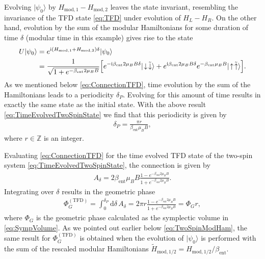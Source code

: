 \documentclass[a4paper,11pt]{article}
\renewcommand{\i}{\text{i}}
\renewcommand{\d}{\text{d}}
\newcommand{\1}{\mathds{1}}
\newcommand{\tfd}{\text{TFD}}
\begin{document}
Evolving $|\psi_0\rangle$ by $H_{\text{mod},1}-H_{\text{mod},2}$ leaves the state invariant, resembling the invariance of the TFD state \eqref{eq:TFD} under evolution of $H_L-H_R$. On the other hand, evolution by the sum of the modular Hamiltonians for some duration of time $\delta$ (modular time in this example)  gives rise to the state
\begin{align}
    U|\psi_0\rangle&=e^{\i(H_{\text{mod},1}+H_{\text{mod},2})\delta}|\psi_0\rangle\notag\\
    &=\frac{1}{\sqrt{1+e^{-\beta_{\text{ent}}2\mu_BB}}}\Big[e^{-\i\beta_{\text{ent}}2\mu_BB\delta}|\!\downarrow\!\tilde{\downarrow}\rangle+e^{\i\beta_{\text{ent}}2\mu_BB\delta}e^{-\beta_{\text{ent}}\mu_BB}|\!\uparrow\!\tilde{\uparrow}\rangle\Big].\label{eq:TimeEvolvedTwoSpinState}
\end{align}
As we mentioned below \eqref{eq:ConnectionTFD}, time evolution by the sum of the Hamiltonians leads  to a periodicity $\delta_P$. Evolving for this amount of time results in exactly the same state as the initial state. With the above result \eqref{eq:TimeEvolvedTwoSpinState} we find that this periodicity is given by
\begin{align}
    \delta_P=\frac{\pi r}{\beta_{\text{ent}}\mu_BB},
\end{align}
where $r\in\mathds{Z}$ is an integer.

Evaluating \eqref{eq:ConnectionTFD} for the time evolved TFD state of the two-spin system \eqref{eq:TimeEvolvedTwoSpinState}, the connection is given by
\begin{align}
    A_\delta=2\beta_{\text{ent}}\mu_BB\frac{1-e^{-\beta_{\text{ent}}2\mu_BB}}{1+e^{-\beta_{\text{ent}}2\mu_BB}}.
\end{align}
Integrating over $\delta$ results in the geometric phase
\begin{align}
    \Phi_G^{(\text{TFD})}=\int_0^{\delta_P}\d\delta\,A_\delta=2\pi r\frac{1-e^{-\beta_{\text{ent}}2\mu_BB}}{1+e^{-\beta_{\text{ent}}2\mu_BB}}=\Phi_Gr,\label{eq:TopPhaseTwoSpin}
\end{align}
where $\Phi_G$ is the geometric phase calculated as the symplectic volume in \eqref{eq:SympVolume}. As we pointed out earlier below \eqref{eq:TwoSpinModHam}, the same result for $\Phi_G^{(\tfd)}$ is obtained when the evolution of $|\psi_0\rangle$ is performed with the sum of the rescaled modular Hamiltonians $\tilde{H}_{\text{mod},1/2}=H_{\text{mod},1/2}/\beta_{\text{ent}}$.
\end{document}
